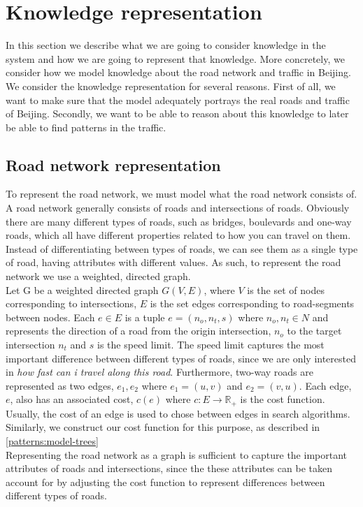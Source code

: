\section{Knowledge representation}
In this section we describe what we are going to consider knowledge in the system and how we are going to represent that knowledge. More concretely, we consider how we model knowledge about the road network and traffic in Beijing. We consider the knowledge representation for several reasons. First of all, we want to make sure that the model adequately portrays the real roads and traffic of Beijing. Secondly, we want to be able to reason about this knowledge to later be able to find patterns in the traffic.

\subsection{Road network representation}
To represent the road network, we must model what the road network consists of. A road network generally consists of roads and intersections of roads. Obviously there are many different types of roads, such as bridges, boulevards and one-way roads, which all have different properties related to how you can travel on them. Instead of differentiating between types of roads, we can see them as a single type of road, having attributes with different values. As such, to represent the road network we use a weighted, directed graph.\\
Let G be a weighted directed graph $G(V,E)$, where $V$ is the set of nodes corresponding to intersections, $E$ is the set edges corresponding to road-segments between nodes. Each $e \in E$ is a tuple $e=(n_o, n_t, s)$ where $n_o, n_t \in N$ and represents the direction of a road from the origin intersection, $n_o$ to the target intersection $n_t$ and $s$ is the speed limit. The speed limit captures the most important difference between different types of roads, since we are only interested in \emph{how fast can i travel along this road}. Furthermore, two-way roads are represented as two edges, $e_1, e_2$ where $e_1 = (u, v)$ and $e_2=(v, u)$. Each edge, $e$, also has an associated cost, $c(e)$ where  $c: E \rightarrow \mathbb R_+$ is the cost function. Usually, the cost of an edge is used to chose between edges in search algorithms. Similarly, we construct our cost function for this purpose, as described in \ref{patterns:model-trees}
\\
Representing the road network as a graph is sufficient to capture the important attributes of roads and intersections, since the these attributes can be taken account for by adjusting the cost function to represent differences between different types of roads. 

